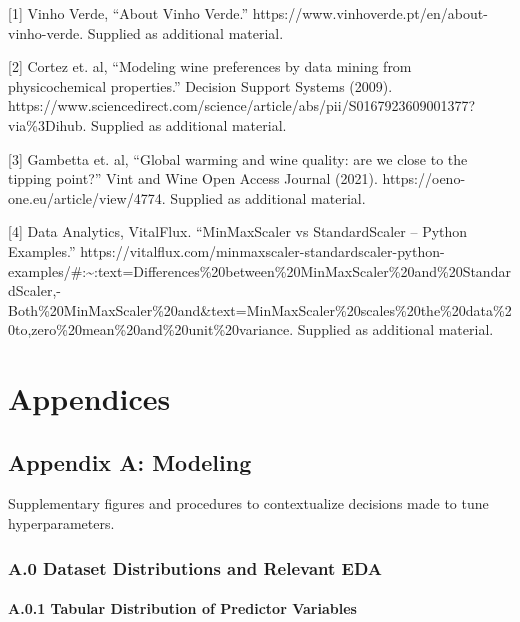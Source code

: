 \documentclass[
  letterpaper,
  DIV=11,
  numbers=noendperiod]{scrartcl}
\let\oldparagraph\paragraph
\renewcommand{\paragraph}[1]{\oldparagraph{#1}\mbox{}}
\begin{document}
{[}1{]} Vinho Verde, ``About Vinho Verde.''
https://www.vinhoverde.pt/en/about-vinho-verde. Supplied as additional
material.

{[}2{]} Cortez et. al, ``Modeling wine preferences by data mining from
physicochemical properties.'' Decision Support Systems (2009).
https://www.sciencedirect.com/science/article/abs/pii/S0167923609001377?via\%3Dihub.
Supplied as additional material.

{[}3{]} Gambetta et. al, ``Global warming and wine quality: are we close
to the tipping point?'' Vint and Wine Open Access Journal (2021).
https://oeno-one.eu/article/view/4774. Supplied as additional material.

{[}4{]} Data Analytics, VitalFlux. ``MinMaxScaler vs StandardScaler --
Python Examples.''
https://vitalflux.com/minmaxscaler-standardscaler-python-examples/\#:\textasciitilde:text=Differences\%20between\%20MinMaxScaler\%20and\%20StandardScaler,-Both\%20MinMaxScaler\%20and\&text=MinMaxScaler\%20scales\%20the\%20data\%20to,zero\%20mean\%20and\%20unit\%20variance.
Supplied as additional material.

\hypertarget{appendices}{%
\section*{Appendices}\label{appendices}}

\hypertarget{appendix-a-modeling}{%
\subsection{Appendix A: Modeling}\label{appendix-a-modeling}}

Supplementary figures and procedures to contextualize decisions made to
tune hyperparameters.

\hypertarget{a.0-dataset-distributions-and-relevant-eda}{%
\subsubsection{A.0 Dataset Distributions and Relevant
EDA}\label{a.0-dataset-distributions-and-relevant-eda}}

\hypertarget{a.0.1-tabular-distribution-of-predictor-variables}{%
\paragraph{A.0.1 Tabular Distribution of Predictor
Variables}\label{a.0.1-tabular-distribution-of-predictor-variables}}
\end{document}
